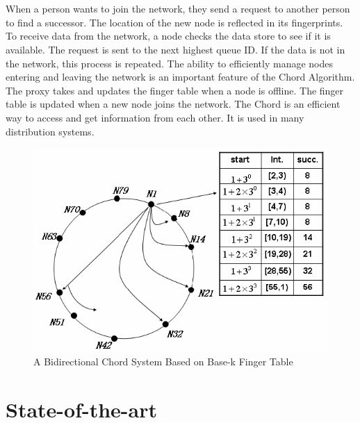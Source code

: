 \documentclass{article}
\begin{document}
\\\\
When a person wants to join the network, they send a request to another person to find a successor. The location of the new node is reflected in its fingerprints. To receive data from the network, a node checks the data store to see if it is available. The request is sent to the next highest queue ID. If the data is not in the network, this process is repeated. The ability to efficiently manage nodes entering and leaving the network is an important feature of the Chord Algorithm. The proxy takes and updates the finger table when a node is offline. The finger table is updated when a new node joins the network. The Chord is an efficient way to access and get information from each other. It is used in many distribution systems. 
\cite{ref1}

\begin{figure}[h]
\centering
\includegraphics[width=\textwidth]{img/ChordAlgorithm}
\caption{A Bidirectional Chord System Based on Base-k Finger Table}
\label{figure 1}
\end{figure}

\pagebreak

\section{State-of-the-art}
\end{document}
